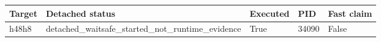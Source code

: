 {\small
\begin{tabular}{lllll}
\hline
Target & Detached status & Executed & PID & Fast claim \\
\hline
h48h8 & detached\_waitsafe\_started\_not\_runtime\_evidence & True & 34090 & False \\
\hline
\end{tabular}
}
